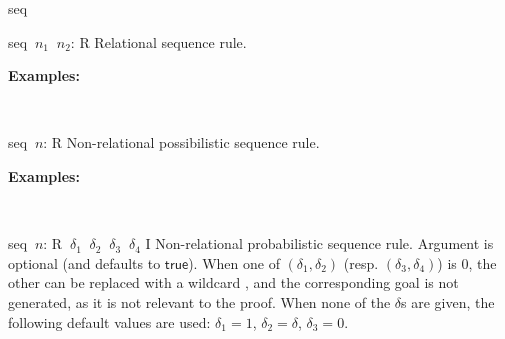 \begin{tactic}{seq}
  \begin{tsyntax}{seq $\ n_1$ $\ n_2$: R}
  Relational sequence rule.

  \textbf{Examples:}
  \begin{mathpar}
    {}%
    \quad{}\\%
  \end{mathpar}
  \end{tsyntax}

  \begin{tsyntax}{seq $\ n$: R}
  Non-relational possibilistic sequence rule.

  \textbf{Examples:}
  \begin{mathpar}
    {}%
    \quad{}\\%
  \end{mathpar}
  \end{tsyntax}

  \begin{tsyntax}{seq $\ n$: R $\ \delta_1$ $\ \delta_2$ $\ \delta_3$ $\ \delta_4$ I}
  Non-relational probabilistic sequence rule. Argument  is
  optional (and defaults to $\mathsf{true}$). When one of
  $(\delta_1,\delta_2)$ (resp. $(\delta_3,\delta_4)$) is 0, the other
  can be replaced with a wildcard \tct{_}, and the corresponding goal
  is not generated, as it is not relevant to the proof. When none of
  the $\delta$s are given, the following default values are used:
  $\delta_1 = 1$, $\delta_2 = \delta$, $\delta_3 = 0$.


\end{tsyntax}
\end{tactic}
